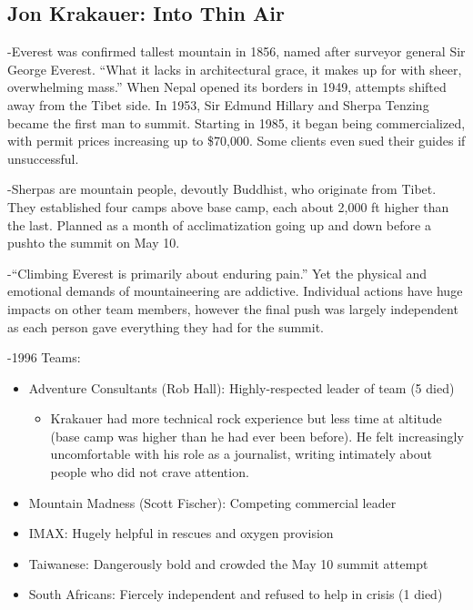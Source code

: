 \documentclass[
]{article}
\providecommand{\tightlist}{%
  \setlength{\itemsep}{0pt}\setlength{\parskip}{0pt}}
\begin{document}
\hypertarget{jon-krakauer-into-thin-air}{%
\subsection{Jon Krakauer: Into Thin
Air}\label{jon-krakauer-into-thin-air}}

-Everest was confirmed tallest mountain in 1856, named after surveyor
general Sir George Everest. ``What it lacks in architectural grace, it
makes up for with sheer, overwhelming mass.'' When Nepal opened its
borders in 1949, attempts shifted away from the Tibet side. In 1953, Sir
Edmund Hillary and Sherpa Tenzing became the first man to summit.
Starting in 1985, it began being commercialized, with permit prices
increasing up to \$70,000. Some clients even sued their guides if
unsuccessful.

-Sherpas are mountain people, devoutly Buddhist, who originate from
Tibet. They established four camps above base camp, each about 2,000 ft
higher than the last. Planned as a month of acclimatization going up and
down before a pushto the summit on May 10.

-``Climbing Everest is primarily about enduring pain.'' Yet the physical
and emotional demands of mountaineering are addictive. Individual
actions have huge impacts on other team members, however the final push
was largely independent as each person gave everything they had for the
summit.

-1996 Teams:

\begin{itemize}
\item
  Adventure Consultants (Rob Hall): Highly-respected leader of team (5
  died)

  \begin{itemize}
  \tightlist
  \item
    Krakauer had more technical rock experience but less time at
    altitude (base camp was higher than he had ever been before). He
    felt increasingly uncomfortable with his role as a journalist,
    writing intimately about people who did not crave attention.
  \end{itemize}
\item
  Mountain Madness (Scott Fischer): Competing commercial leader
\item
  IMAX: Hugely helpful in rescues and oxygen provision
\item
  Taiwanese: Dangerously bold and crowded the May 10 summit attempt
\item
  South Africans: Fiercely independent and refused to help in crisis (1
  died)
\end{itemize}
\end{document}
